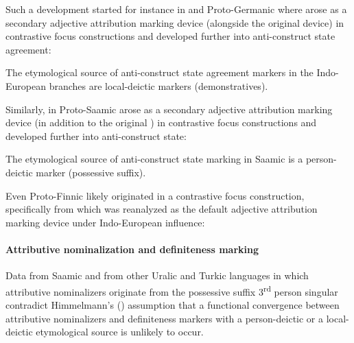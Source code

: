 Such a development started for instance in  and Proto\hyp{}Germanic where  arose as a secondary adjective attribution marking device (alongside the original  device) in contrastive focus constructions and developed further into anti\hyp{}construct state agreement:
\begin{exe}
\end{exe}

The etymological source of anti\hyp{}construct state agreement markers in the Indo-European branches are local-deictic markers (demonstratives).

Similarly, in Proto\hyp{}Saamic  arose as a secondary adjective attribution marking device (in addition to the original ) in contrastive focus constructions and developed further into anti\hyp{}construct state:
\begin{exe}
\end{exe}

The etymological source of anti\hyp{}construct state marking in Saamic is a person-deictic marker (possessive suffix).

Even Proto\hyp{}Finnic  likely originated in a contrastive focus construction, specifically from  which was reanalyzed as the default adjective attribution marking device under Indo-European influence:
\begin{exe}
\end{exe}

\paragraph*{Attributive nominalization and definiteness marking}
Data from Saamic and from other Uralic and Turkic languages in which attributive nominalizers originate from the possessive suffix 3\textsuperscript{rd} person singular contradict Himmelmann's (\citeyear[220–221]{himmelmann1997}) assumption that a functional convergence between attributive nominalizers and definiteness markers with a person-deictic or a local-deictic etymological source is unlikely to occur. 


